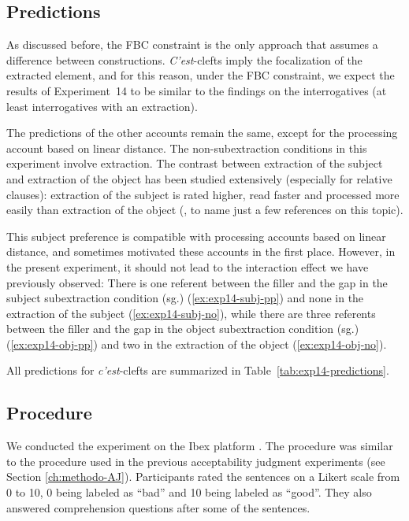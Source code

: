 \subsection{Predictions}

As discussed before, the FBC constraint is the only approach that assumes a difference between constructions. \emph{C'est}-clefts imply the focalization of the extracted element, and for this reason, under the FBC constraint, we expect the results of Experiment~14 to be similar to the findings on the interrogatives (at least interrogatives with an extraction). 

The predictions of the other accounts remain the same, except for the processing account based on linear distance. The non\hyp subextraction conditions in this experiment involve extraction. The contrast between extraction of the subject and extraction of the object has been studied extensively (especially for relative clauses): extraction of the subject is rated higher, read faster and processed more easily than extraction of the object (\citealt{Gibson.1998}, \citealt{Pozniak.2015} to name just a few references on this topic). 

This subject preference is compatible with processing accounts based on linear distance, and sometimes motivated these accounts in the first place. However, in the present experiment, it should not lead to the interaction effect we have previously observed:  There is one referent between the filler and the gap in the subject subextraction condition (sg.) (\ref{ex:exp14-subj-pp}) and none in the extraction of the subject (\ref{ex:exp14-subj-no}), while there are three referents between the filler and the gap in the object subextraction condition (sg.)  (\ref{ex:exp14-obj-pp}) and two in the extraction of the object (\ref{ex:exp14-obj-no}).

All predictions for \emph{c'est}-clefts are summarized in Table~\ref{tab:exp14-predictions}.



\subsection{Procedure} 

We conducted the experiment on the Ibex platform \citep{Ibex}. The procedure was similar to the procedure used in the previous acceptability judgment experiments (see Section \ref{ch:methodo-AJ}). Participants rated the sentences on a Likert scale from 0 to 10, 0 being labeled as ``bad'' and 10 being labeled as ``good''. They also answered comprehension questions after some of the sentences.

